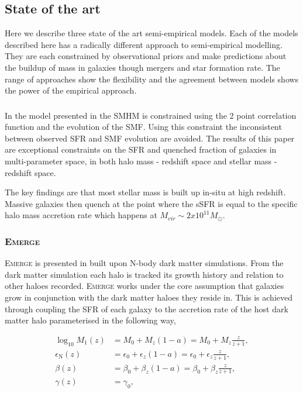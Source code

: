 \subsection{State of the art}
Here we describe three state of the art semi-empirical models. Each of the models described here has a radically different approach to semi-empirical modelling. They are each constrained by observational priors and make predictions about the buildup of mass in galaxies though mergers and star formation rate. The range of approaches show the flexibility and the agreement between models shows the power of the empirical approach. 


\subsubsection{\citet{Rodriguez-Puebla2017ConstrainingProperties}}
In the model presented in \citet{Rodriguez-Puebla2017ConstrainingProperties} the SMHM is constrained using the 2 point correlation function and the evolution of the SMF. Using this constraint the inconsistent between observed SFR and SMF evolution are avoided. The results of this paper are exceptional constraints on the SFR and quenched fraction of galaxies in multi-parameter space, in both halo mass - redshift space and stellar mass - redshift space.


The key findings are that most stellar mass is built up in-situ at high redshift. Massive galaxies then quench at the point where the sSFR is equal to the specific halo mass accretion rate which happens at $M_{vir} \sim 2 x 10^{11} M_{\odot}$.


\subsubsection{E\textsc{merge}}
E\textsc{merge} is presented in \citet{Moster2018Emerge10} built upon N-body dark matter simulations. From the dark matter simulation each halo is tracked its growth history and relation to other haloes recorded. E\textsc{merge} works under the core assumption that galaxies grow in conjunction with the dark matter haloes they reside in. This is achieved through coupling the SFR of each galaxy to the accretion rate of the host dark matter halo parameterised in the following way,

\begin{equation}
\begin{aligned} \log _{10} M_{1}(z) &=M_{0}+M_{z}(1-a)=M_{0}+M_{z} \frac{z}{z+1}, \\ \epsilon_{\mathrm{N}}(z) &=\epsilon_{0}+\epsilon_{z}(1-a)=\epsilon_{0}+\epsilon_{z} \frac{z}{z+1}, \\ \beta(z) &=\beta_{0}+\beta_{z}(1-a)=\beta_{0}+\beta_{z} \frac{z}{z+1}, \\ \gamma(z) &=\gamma_{0}, \end{aligned}
\end{equation}

